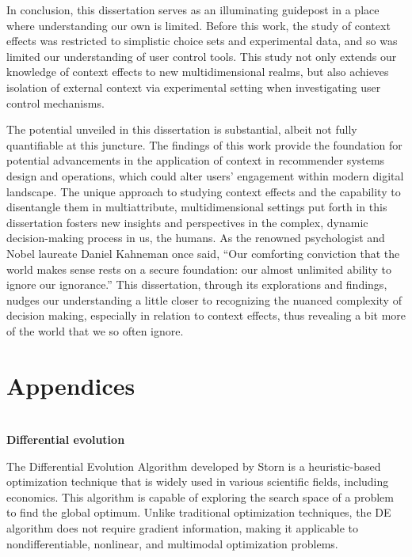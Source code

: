 \documentclass[a4paper,12pt]{article}
\newcommand{\citeyearonly}[1]{\citeyearpar{#1}}
\begin{document}
In conclusion, this dissertation serves as an illuminating guidepost in a place where understanding our own is limited. Before this work, the study of context effects was restricted to simplistic choice sets and experimental data, and so was limited our understanding of user control tools.  This study not only extends our knowledge of context effects to new multidimensional realms, but also achieves isolation of external context via experimental setting when investigating user control mechanisms.

The potential unveiled in this dissertation is substantial, albeit not fully quantifiable at this juncture. The findings of this work provide the foundation for potential advancements in the application of context in recommender systems design and operations, which could alter users' engagement within modern digital landscape. The unique approach to studying context effects and the capability to disentangle them in multiattribute, multidimensional settings put forth in this dissertation fosters new insights and perspectives in the complex, dynamic decision-making process in us, the humans. As the renowned psychologist and Nobel laureate Daniel Kahneman once said, ``Our comforting conviction that the world makes sense rests on a secure foundation: our almost unlimited ability to ignore our ignorance.'' This dissertation, through its explorations and findings, nudges our understanding a little closer to recognizing the nuanced complexity of decision making, especially in relation to context effects, thus revealing a bit more of the world that we so often ignore.

\newpage

%




\clearpage

\section{Appendices}
\appendix
\section{}\label{appendix:Differential evolution}
\textbf{Differential evolution}

The Differential Evolution Algorithm developed by Storn \citeyearonly{storn1997differential} is a heuristic-based optimization technique that is widely used in various scientific fields, including economics. This algorithm is capable of exploring the search space of a problem to find the global optimum. Unlike traditional optimization techniques, the DE algorithm does not require gradient information, making it applicable to nondifferentiable, nonlinear, and multimodal optimization problems.
\end{document}
